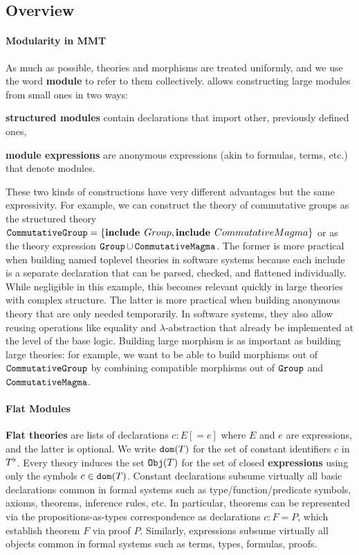 \subsection{Overview}

\begin{modexp}
\paragraph{Modularity in MMT}
As much as possible, theories and morphisms are treated uniformly, and we use the word \textbf{module} to refer to them collectively.
\mmt allows constructing large modules from small ones in two ways:
\begin{compactitem}
  \item \textbf{structured modules} contain declarations that import other, previously defined ones,
  \item \textbf{module expressions} are anonymous expressions (akin to formulas, terms, etc.) that denote modules.
\end{compactitem}

These two kinds of constructions have very different advantages but the same expressivity.
For example, we can construct the theory of commutative groups as the structured theory $\operatorname{\mathtt{CommutativeGroup}}=\{\operatorname{\mathbf{include}}{\;Group},\operatorname{\mathbf{include}}{\;CommutativeMagma}\}$ or as the theory expression $\operatorname{\mathtt{Group}}\cup\operatorname{\mathtt{CommutativeMagma}}$.
The former is more practical when building named toplevel theories in software systems because each include is a separate declaration that can be parsed, checked, and flattened individually.
While negligible in this example, this becomes relevant quickly in large theories with complex structure.
The latter is more practical when building anonymous theory that are only needed temporarily.
In software systems, they also allow reusing operations like equality and $\lambda$-abstraction that already be implemented at the level of the base logic.
Building large morphism is as important as building large theories: for example, we want to be able to build morphisms out of $\operatorname{\mathtt{CommutativeGroup}}$ by combining compatible morphisms out of $\operatorname{\mathtt{Group}}$ and $\operatorname{\mathtt{CommutativeMagma}}$.
\end{modexp}

\paragraph{Flat Modules}
\textbf{Flat theories} are lists of declarations $c:E[=e]$ where $E$ and $e$ are expressions, and the latter is optional.
We write $\mathtt{dom}(T)$ for the set of constant identifiers $c$ in $T^\flat$.
Every theory induces the set $\mathtt{Obj}(T)$ for the set of closed \textbf{expressions} using only the symbols $c\in\mathtt{dom}(T)$.
Constant declarations subsume virtually all basic declarations common in formal systems such as type/function/predicate symbols, axioms, theorems, inference rules, etc.
In particular, theorems can be represented via the propositions-as-types correspondence as declarations $c:F=P$, which establish theorem $F$ via proof $P$.
Similarly, \mmt expressions subsume virtually all objects common in formal systems such as terms, types, formulas, proofs.

